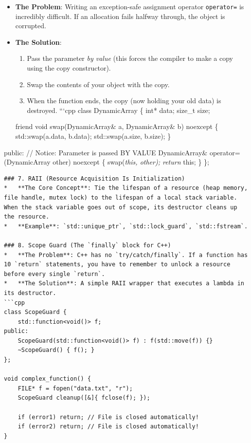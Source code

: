 \begin{itemize}
\tightlist
\item
  \textbf{The Problem}: Writing an exception-safe assignment operator
  \passthrough{\lstinline!operator=!} is incredibly difficult. If an
  allocation fails halfway through, the object is corrupted.
\item
  \textbf{The Solution}:

  \begin{enumerate}
  \def\labelenumi{\arabic{enumi}.}
  \tightlist
  \item
    Pass the parameter \emph{by value} (this forces the compiler to make
    a copy using the copy constructor).
  \item
    Swap the contents of your object with the copy.
  \item
    When the function ends, the copy (now holding your old data) is
    destroyed. ```cpp class DynamicArray \{ int* data; size\_t size;
  \end{enumerate}

  friend void swap(DynamicArray\& a, DynamicArray\& b) noexcept \{
  std::swap(a.data, b.data); std::swap(a.size, b.size); \}
\end{itemize}

public: // Notice: Parameter is passed BY VALUE DynamicArray\&
operator=(DynamicArray other) noexcept \{ swap(\emph{this, other);
return }this; \} \};

\begin{lstlisting}
### 7. RAII (Resource Acquisition Is Initialization)
*   **The Core Concept**: Tie the lifespan of a resource (heap memory, file handle, mutex lock) to the lifespan of a local stack variable. When the stack variable goes out of scope, its destructor cleans up the resource.
*   **Example**: `std::unique_ptr`, `std::lock_guard`, `std::fstream`.

### 8. Scope Guard (The `finally` block for C++)
*   **The Problem**: C++ has no `try/catch/finally`. If a function has 10 `return` statements, you have to remember to unlock a resource before every single `return`.
*   **The Solution**: A simple RAII wrapper that executes a lambda in its destructor.
```cpp
class ScopeGuard {
    std::function<void()> f;
public:
    ScopeGuard(std::function<void()> f) : f(std::move(f)) {}
    ~ScopeGuard() { f(); }
};

void complex_function() {
    FILE* f = fopen("data.txt", "r");
    ScopeGuard cleanup([&]{ fclose(f); });
    
    if (error1) return; // File is closed automatically!
    if (error2) return; // File is closed automatically!
}
\end{lstlisting}

